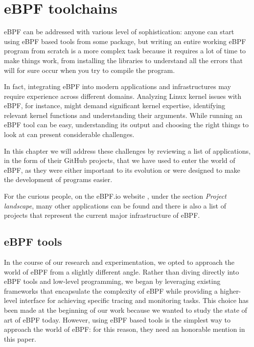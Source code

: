 \chapter{eBPF toolchains}

eBPF can be addressed with various level of sophistication: anyone can start using eBPF based tools from some package, but writing an entire working eBPF program from scratch is a more complex task because it requires a lot of time to make things work, from installing the libraries to understand all the errors that will for sure occur when you try to compile the program.

In fact, integrating eBPF into modern applications and infrastructures may require experience across different domains. 
Analyzing Linux kernel issues with eBPF, for instance, might demand significant kernel expertise, identifying relevant kernel functions and understanding their arguments.
While running an eBPF tool can be easy, understanding its output and choosing the right things to look at can present considerable challenges.

In this chapter we will address these challenges by reviewing a list of applications, in the form of their GitHub projects, that we have used to enter the world of eBPF, as they were either important to its evolution or were designed to make the development of programs easier.

For the curious people, on the eBPF.io website \cite{eBPFioWebsite}, under the section \textit{Project landscape}, many other applications can be found and there is also a list of projects that represent the current major infrastructure of eBPF.

\section{eBPF tools}

In the course of our research and experimentation, we opted to approach the world of eBPF from a slightly different angle. 
Rather than diving directly into eBPF tools and low-level programming, we began by leveraging existing frameworks that encapsulate the complexity of eBPF while providing a higher-level interface for achieving specific tracing and monitoring tasks.
This choice has been made at the beginning of our work because we wanted to study the state of art of eBPF today.
However, using eBPF based tools is the simplest way to approach the world of eBPF: for this reason, they need an honorable mention in this paper.

